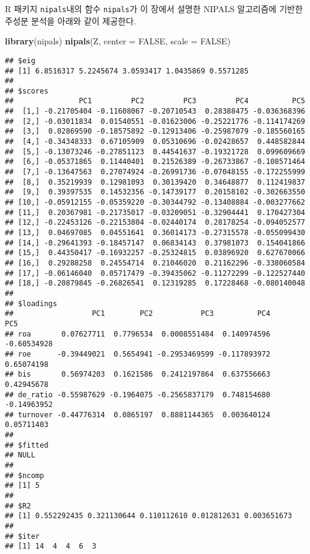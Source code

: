 \documentclass[]{book}
\newenvironment{Shaded}{\begin{snugshade}}{\end{snugshade}}
\newcommand{\DataTypeTok}[1]{\textcolor[rgb]{0.13,0.29,0.53}{#1}}
\newcommand{\KeywordTok}[1]{\textcolor[rgb]{0.13,0.29,0.53}{\textbf{#1}}}
\newcommand{\NormalTok}[1]{#1}
\newcommand{\OtherTok}[1]{\textcolor[rgb]{0.56,0.35,0.01}{#1}}
\begin{document}
R 패키지 \texttt{nipals}내의 함수 \texttt{nipals}가 이 장에서 설명한 NIPALS 알고리즘에 기반한 주성분 분석을 아래와 같이 제공한다.

\begin{Shaded}
\begin{Highlighting}[]
\KeywordTok{library}\NormalTok{(nipals)}
\KeywordTok{nipals}\NormalTok{(Z, }\DataTypeTok{center =} \OtherTok{FALSE}\NormalTok{, }\DataTypeTok{scale =} \OtherTok{FALSE}\NormalTok{)}
\end{Highlighting}
\end{Shaded}

\begin{verbatim}
## $eig
## [1] 6.8516317 5.2245674 3.0593417 1.0435869 0.5571285
## 
## $scores
##               PC1         PC2         PC3         PC4          PC5
##  [1,] -0.21705404 -0.11608067 -0.20710543  0.28388475 -0.036368396
##  [2,] -0.03011834  0.01540551 -0.01623006 -0.25221776 -0.114174269
##  [3,]  0.02869590 -0.18575892 -0.12913406 -0.25987079 -0.185560165
##  [4,] -0.34348333  0.67105909  0.05310696 -0.02428657  0.448582844
##  [5,] -0.13073246 -0.27851123  0.44541637 -0.19321728  0.099609669
##  [6,] -0.05371865  0.11440401  0.21526389 -0.26733867 -0.108571464
##  [7,] -0.13647563  0.27074924 -0.26991736 -0.07048155 -0.172255999
##  [8,]  0.35219939  0.12981093  0.30139420  0.34648877  0.112419837
##  [9,]  0.39397535  0.14532356 -0.14739177  0.20158102 -0.302663550
## [10,] -0.05912155 -0.05359220 -0.30344792 -0.13408884 -0.003277662
## [11,]  0.20367981 -0.21735017 -0.03209051 -0.32904441  0.170427304
## [12,] -0.22453126 -0.22153804 -0.02440174  0.28178254 -0.094052577
## [13,]  0.04697085  0.04551641  0.36014173 -0.27315578 -0.055099430
## [14,] -0.29641393 -0.18457147  0.06834143  0.37981073  0.154041866
## [15,]  0.44350417 -0.16932257 -0.25324815  0.03896920  0.627670066
## [16,]  0.29288258  0.24554714  0.21046020  0.21162296 -0.338060584
## [17,] -0.06146040  0.05717479 -0.39435062 -0.11272299 -0.122527440
## [18,] -0.20879845 -0.26826541  0.12319285  0.17228468 -0.080140048
## 
## $loadings
##                  PC1        PC2           PC3          PC4         PC5
## roa       0.07627711  0.7796534  0.0008551484  0.140974596 -0.60534928
## roe      -0.39449021  0.5654941 -0.2953469599 -0.117893972  0.65074198
## bis       0.56974203  0.1621586  0.2412197864  0.637556663  0.42945678
## de_ratio -0.55987629 -0.1964075 -0.2565837179  0.748154680 -0.14963952
## turnover -0.44776314  0.0865197  0.8881144365  0.003640124  0.05711403
## 
## $fitted
## NULL
## 
## $ncomp
## [1] 5
## 
## $R2
## [1] 0.552292435 0.321130644 0.110112610 0.012812631 0.003651673
## 
## $iter
## [1] 14  4  4  6  3
\end{verbatim}
\end{document}
